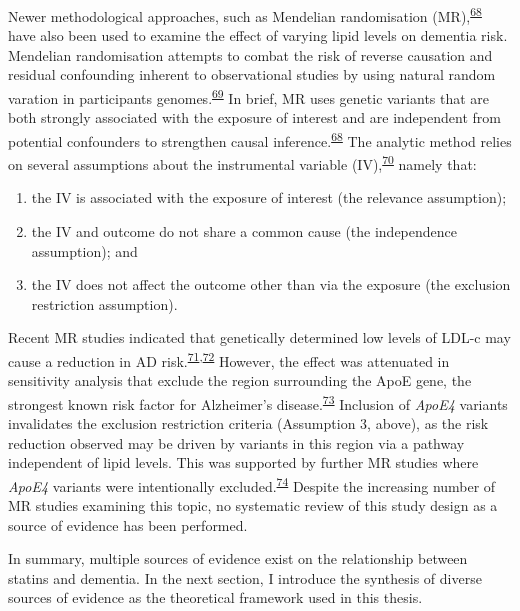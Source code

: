 \documentclass[a4paper, twoside]{templates/ociamthesis}
\providecommand{\tightlist}{%
  \setlength{\itemsep}{0pt}\setlength{\parskip}{0pt}}
\begin{document}
Newer methodological approaches, such as Mendelian randomisation (MR),\textsuperscript{\protect\hyperlink{ref-daveysmith2014}{68}} have also been used to examine the effect of varying lipid levels on dementia risk. Mendelian randomisation attempts to combat the risk of reverse causation and residual confounding inherent to observational studies by using natural random varation in participants genomes.\textsuperscript{\protect\hyperlink{ref-greenland2000}{69}} In brief, MR uses genetic variants that are both strongly associated with the exposure of interest and are independent from potential confounders to strengthen causal inference.\textsuperscript{\protect\hyperlink{ref-daveysmith2014}{68}} The analytic method relies on several assumptions about the instrumental variable (IV),\textsuperscript{\protect\hyperlink{ref-davies2018}{70}} namely that:

\begin{enumerate}
\def\labelenumi{\arabic{enumi}.}
\tightlist
\item
  the IV is associated with the exposure of interest (the relevance assumption);
\item
  the IV and outcome do not share a common cause (the independence assumption); and
\item
  the IV does not affect the outcome other than via the exposure (the exclusion restriction assumption).
\end{enumerate}

Recent MR studies indicated that genetically determined low levels of LDL-c may cause a reduction in AD risk.\textsuperscript{\protect\hyperlink{ref-larsson2017}{71},\protect\hyperlink{ref-ostergaard2015}{72}} However, the effect was attenuated in sensitivity analysis that exclude the region surrounding the ApoE gene, the strongest known risk factor for Alzheimer's disease.\textsuperscript{\protect\hyperlink{ref-kim2009}{73}} Inclusion of \emph{ApoE4} variants invalidates the exclusion restriction criteria (Assumption 3, above), as the risk reduction observed may be driven by variants in this region via a pathway independent of lipid levels. This was supported by further MR studies where \emph{ApoE4} variants were intentionally excluded.\textsuperscript{\protect\hyperlink{ref-benn2017}{74}} Despite the increasing number of MR studies examining this topic, no systematic review of this study design as a source of evidence has been performed.

In summary, multiple sources of evidence exist on the relationship between statins and dementia. In the next section, I introduce the synthesis of diverse sources of evidence as the theoretical framework used in this thesis.
\end{document}
